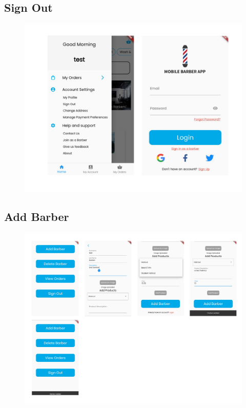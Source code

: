 \documentclass[12pt]{article}
\begin{document}
	\subsection{Sign Out}
	\label{app-image: sign-out}
	\begin{figure}[H]
		\centering
		\includegraphics[scale=0.22]{images/sign-out.png}
	\end{figure}

	\subsection{Add Barber}
	\label{app-image: add-barber}
	\begin{figure}[H]
		\centering
		\includegraphics[scale=0.22]{images/add-barber.png}
	\end{figure}
\end{document}
